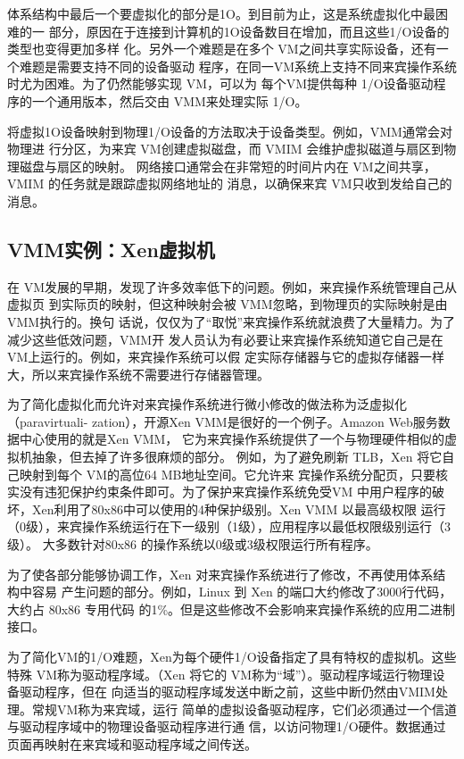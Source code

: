 体系结构中最后一个要虚拟化的部分是1O。到目前为止，这是系统虚拟化中最困难的一
部分，原因在于连接到计算机的1O设备数目在增加，而且这些1/O设备的类型也变得更加多样
化。另外一个难题是在多个 VM之间共享实际设备，还有一个难题是需要支持不同的设备驱动
程序，在同一VM系统上支持不同来宾操作系统时尤为困难。为了仍然能够实现 VM，可以为
每个VM提供每种 1/O设备驱动程序的一个通用版本，然后交由 VMM来处理实际 1/O。

将虚拟1O设备映射到物理1/O设备的方法取决于设备类型。例如，VMM通常会对物理进
行分区，为来宾 VM创建虚拟磁盘，而 VMIM 会维护虚拟磁道与扇区到物理磁盘与扇区的映射。
网络接口通常会在非常短的时间片内在 VM之间共享，VMIM 的任务就是跟踪虚拟网络地址的
消息，以确保来宾 VM只收到发给自己的消息。

\subsection{VMM实例：Xen虚拟机}

在 VM发展的早期，发现了许多效率低下的问题。例如，来宾操作系统管理自己从虚拟页
到实际页的映射，但这种映射会被 VMM忽略，到物理页的实际映射是由 VMM执行的。换句
话说，仅仅为了“取悦”来宾操作系统就浪费了大量精力。为了减少这些低效问题，VMM开
发人员认为有必要让来宾操作系统知道它自己是在 VM上运行的。例如，来宾操作系统可以假
定实际存储器与它的虚拟存储器一样大，所以来宾操作系统不需要进行存储器管理。

为了简化虚拟化而允许对来宾操作系统进行微小修改的做法称为泛虚拟化（paravirtuali-
zation），开源Xen VMM是很好的一个例子。Amazon Web服务数据中心使用的就是Xen VMM，
它为来宾操作系统提供了一个与物理硬件相似的虚拟机抽象，但去掉了许多很麻烦的部分。
例如，为了避免刷新 TLB，Xen 将它自己映射到每个 VM的高位64 MB地址空间。它允许来
宾操作系统分配页，只要核实没有违犯保护约束条件即可。为了保护来宾操作系统免受VM
中用户程序的破坏，Xen利用了80x86中可以使用的4种保护级别。Xen VMM 以最高级权限
运行（0级），来宾操作系统运行在下一级别（1级），应用程序以最低权限级别运行（3级）。
大多数针对80x86 的操作系统以0级或3级权限运行所有程序。

为了使各部分能够协调工作，Xen 对来宾操作系统进行了修改，不再使用体系结构中容易
产生问题的部分。例如，Linux 到 Xen 的端口大约修改了3000行代码，大约占 80x86 专用代码
的1\%。但是这些修改不会影响来宾操作系统的应用二进制接口。

为了简化VM的1/O难题，Xen为每个硬件1/O设备指定了具有特权的虚拟机。这些特殊
VM称为驱动程序域。（Xen 将它的 VM称为“域”）。驱动程序域运行物理设备驱动程序，但在
向适当的驱动程序域发送中断之前，这些中断仍然由VMIM处理。常规VM称为来宾域，运行
简单的虚拟设备驱动程序，它们必须通过一个信道与驱动程序域中的物理设备驱动程序进行通
信，以访问物理1/O硬件。数据通过页面再映射在来宾域和驱动程序域之间传送。

